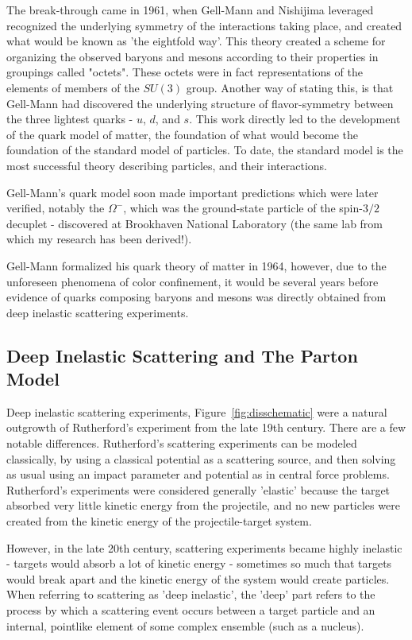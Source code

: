 The break-through came in 1961, when Gell-Mann and Nishijima leveraged
recognized the underlying symmetry of the interactions taking place, and created
what would be known as 'the eightfold way'. This theory created a scheme for
organizing the observed baryons and mesons according to their properties in
groupings called "octets". These octets were in fact representations of the
elements of members of the $SU(3)$ group. Another way of stating this, is that
Gell-Mann had discovered the underlying structure of flavor-symmetry between the
three lightest quarks - $u$, $d$, and $s$. This work directly led to the
development of the quark model of matter, the foundation of what would become
the foundation of the standard model of particles. To date, the standard model
is the most successful theory describing particles, and their interactions.

Gell-Mann's quark model soon made important predictions which were later
verified, notably the $\Omega^{-}$, which was the ground-state particle of the
spin-$3/2$ decuplet - discovered at Brookhaven National Laboratory (the same lab
from which my research has been derived!). 

Gell-Mann formalized his quark theory of matter in 1964, however, due to the
unforeseen phenomena of color confinement, it would be several years before
evidence of quarks composing baryons and mesons was directly obtained from deep
inelastic scattering experiments.

\clearpage
\subsection{Deep Inelastic Scattering and The Parton Model}

Deep inelastic scattering experiments, Figure~\ref{fig:disschematic} were a
natural outgrowth of Rutherford's experiment from the late 19th century. There
are a few notable differences.  Rutherford's scattering experiments can be
modeled classically, by using a classical potential as a scattering source, and
then solving as usual using an impact parameter and potential as in central
force problems. Rutherford's experiments were considered generally 'elastic'
because the target absorbed very little kinetic energy from the projectile, and
no new particles were created from the kinetic energy of the projectile-target
system.

However, in the late 20th century, scattering experiments became highly
inelastic - targets would absorb a lot of kinetic energy - sometimes so much
that targets would break apart and the kinetic energy of the system would create
particles. When referring to scattering as 'deep inelastic', the 'deep' part
refers to the process by which a scattering event occurs between a target
particle and an internal, pointlike element of some complex ensemble (such as a
nucleus).

